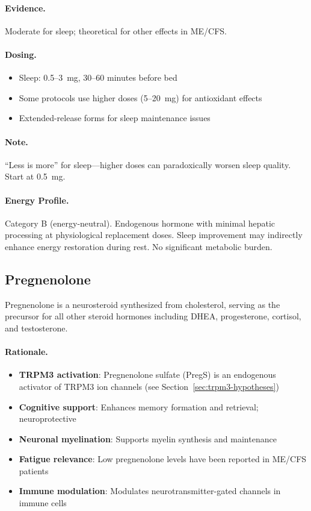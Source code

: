 \paragraph{Evidence.} Moderate for sleep; theoretical for other effects in ME/CFS.

\paragraph{Dosing.}
\begin{itemize}
    \item Sleep: 0.5--3~mg, 30--60 minutes before bed
    \item Some protocols use higher doses (5--20~mg) for antioxidant effects
    \item Extended-release forms for sleep maintenance issues
\end{itemize}

\paragraph{Note.} ``Less is more'' for sleep---higher doses can paradoxically worsen sleep quality. Start at 0.5~mg.

\paragraph{Energy Profile.}
Category B (energy-neutral). Endogenous hormone with minimal hepatic processing at physiological replacement doses. Sleep improvement may indirectly enhance energy restoration during rest. No significant metabolic burden.

\subsection{Pregnenolone}
\label{subsec:pregnenolone}

Pregnenolone is a neurosteroid synthesized from cholesterol, serving as the precursor for all other steroid hormones including DHEA, progesterone, cortisol, and testosterone.

\paragraph{Rationale.}
\begin{itemize}
    \item \textbf{TRPM3 activation}: Pregnenolone sulfate (PregS) is an endogenous activator of TRPM3 ion channels (see Section~\ref{sec:trpm3-hypotheses})
    \item \textbf{Cognitive support}: Enhances memory formation and retrieval; neuroprotective
    \item \textbf{Neuronal myelination}: Supports myelin synthesis and maintenance
    \item \textbf{Fatigue relevance}: Low pregnenolone levels have been reported in ME/CFS patients
    \item \textbf{Immune modulation}: Modulates neurotransmitter-gated channels in immune cells
\end{itemize}

